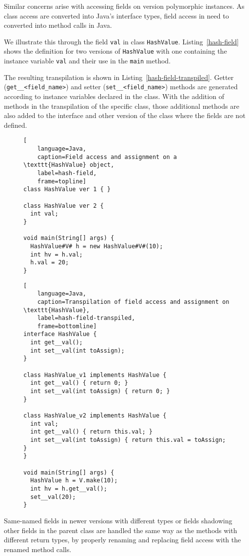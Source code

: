 Similar concerns arise with accessing fields on version polymorphic instances. 
As class access are converted into Java's interface types, 
field access in \lang{} need to converted into method calls in Java.

We illustrate this through the field \texttt{val} in class \texttt{HashValue}. 
Listing~\ref{hash-field} shows the definition for two versions of \texttt{HashValue} 
with one containing the instance variable \texttt{val} 
and their use in the \texttt{main} method.

The resulting transpilation is shown in Listing~\ref{hash-field-transpiled}. 
Getter (\texttt{get\_\_<field\_name>}) and setter (\texttt{set\_\_<field\_name>}) 
methods are generated according to instance variables declared in the class. 
With the addition of methods in the transpilation of the specific class, 
those additional methods are also added to the interface and other version 
of the class where the fields are not defined. 

\begin{figure}[h!]
\begin{lstlisting}[
    language=Java,
    caption=Field access and assignment on a \texttt{HashValue} object,
    label=hash-field,
    frame=topline]
class HashValue ver 1 { }

class HashValue ver 2 {
  int val;
}

void main(String[] args) {
  HashValue#V# h = new HashValue#V#(10);
  int hv = h.val;
  h.val = 20;
}
\end{lstlisting}

\begin{lstlisting}[
    language=Java,
    caption=Transpilation of field access and assignment on \texttt{HashValue},
    label=hash-field-transpiled,
    frame=bottomline]
interface HashValue {
  int get__val();
  int set__val(int toAssign);
}

class HashValue_v1 implements HashValue {
  int get__val() { return 0; }
  int set__val(int toAssign) { return 0; }
}

class HashValue_v2 implements HashValue {
  int val;
  int get__val() { return this.val; }
  int set__val(int toAssign) { return this.val = toAssign; }
}

void main(String[] args) {
  HashValue h = V.make(10);
  int hv = h.get__val();
  set__val(20);
}
\end{lstlisting}
\end{figure}

Same-named fields in newer versions with different types or fields shadowing 
other fields in the parent class are handled the same way as the methods 
with different return types, by properly renaming and replacing field access 
with the renamed method calls.